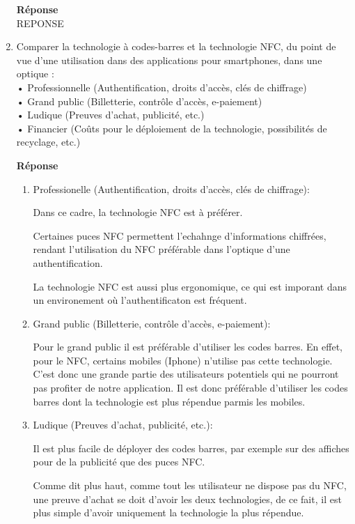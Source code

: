\documentclass[a4paper]{article}
\begin{document}
\begin{enumerate}
    \textbf{Réponse} \\
    REPONSE
	
    \item Comparer la technologie à codes-barres et la technologie NFC, du point de vue d'une utilisation dans des applications pour smartphones, dans une optique : \\
    • Professionnelle (Authentification, droits d’accès, clés de chiffrage) \\
    • Grand public (Billetterie, contrôle d’accès, e-paiement) \\
    • Ludique (Preuves d'achat, publicité, etc.) \\
    • Financier (Coûts pour le déploiement de la technologie, possibilités de recyclage, etc.)
    
    \textbf{Réponse} \\
	\begin{enumerate}

\item
Professionelle (Authentification, droits d’accès, clés de chiffrage):

Dans ce cadre, la technologie NFC est à préférer.

Certaines puces NFC permettent l'echahnge d'informations chiffrées, rendant l'utilisation du NFC préférable dans l'optique d'une authentification.

La technologie NFC est aussi plus ergonomique, ce qui est imporant dans un environement où l'authentificaton est fréquent.




\item
Grand public (Billetterie, contrôle d’accès, e-paiement):

Pour le grand public il est préférable d'utiliser les codes barres. En effet, pour le NFC, certains mobiles (Iphone) n'utilise pas cette technologie. C'est donc une grande partie des utilisateurs potentiels qui ne pourront pas profiter de notre application. Il est donc préférable d'utiliser les codes barres dont la technologie est plus répendue parmis les mobiles.

\item
Ludique (Preuves d'achat, publicité, etc.):

Il est plus facile de déployer des codes barres, par exemple sur des affiches pour de la publicité que des puces NFC.

Comme dit plus haut, comme tout les utilisateur ne dispose pas du NFC, une preuve d'achat se doit d'avoir les deux technologies, de ce fait, il est plus simple d'avoir uniquement la technologie la plus répendue.


\end{enumerate}
\end{enumerate}
\end{document}
